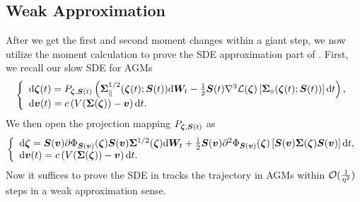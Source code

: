 \subsection{Weak Approximation}
\label{sec:weak-approximation}
After we get the first and second moment changes within a giant step, we now utilize the moment calculation to prove the SDE approximation part of . First, we recall our slow SDE for AGMs
\begin{align*}
    \left\{\begin{array}{l}
         \mathrm{d} {\bm{\zeta}}(t) = P_{{\bm{\zeta}},{\bm{S}}(t)}\left({\bm{\Sigma}}_{\parallel}^{1/2}({\bm{\zeta}}(t); {\bm{S}}(t))\mathrm{d} {\bm{W}}_t- \frac{1}{2}{\bm{S}}(t)\nabla^3\mathcal{L}({\bm{\zeta}})\left[{\bm{\Sigma}}_{\diamond}({\bm{\zeta}}(t); {\bm{S}}(t))\right]\mathrm{d} t\right), \\
         \mathrm{d} {\bm{v}}(t) = c \left(V({\bm{\Sigma}}({\bm{\zeta}})) - {\bm{v}}\right) \mathrm{d} t.
    \end{array}\right. 
\end{align*}
We then open the projection mapping $P_{{\bm{\zeta}},{\bm{S}}(t)}$ as
\begin{align}
    \left\{\begin{array}{l}
         \mathrm{d} {\bm{\zeta}} = {\bm{S}}({\bm{v}})\partial\Phi_{{\bm{S}}({\bm{v}})}({\bm{\zeta}}){\bm{S}}({\bm{v}}) {\bm{\Sigma}}^{1/2}({\bm{\zeta}})\mathrm{d} {\bm{W}}_t + \frac{1}{2} {\bm{S}}({\bm{v}}) \partial^2 \Phi_{{\bm{S}}({\bm{v}})}({\bm{\zeta}})\left[{\bm{S}}({\bm{v}}){\bm{\Sigma}}({\bm{\zeta}}){\bm{S}}({\bm{v}})\right]\mathrm{d} t, \\
         \mathrm{d} {\bm{v}}(t) = c \left(V({\bm{\Sigma}}({\bm{\zeta}})) - {\bm{v}}\right) \mathrm{d} t.
    \end{array}\right. \label{equ:AGMs-SDE-no-projection}
\end{align}
Now it suffices to prove the SDE in  tracks the trajectory in AGMs within $\mathcal{O}(\frac{1}{\eta^2})$ steps in a weak approximation sense.

